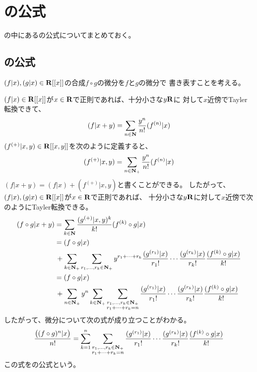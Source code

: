 {\setlength\arraycolsep{2pt}
%
\section{{\Faa}の公式}\label{s1:Faa di Brunoの公式} %
	\cite{brouder:2004}の中にある{\Faa}の公式についてまとめておく。
\subsection{{\Faa}の公式}\label{s2:Faa di Brunoの公式} %
	$(f|x),(g|x)\in\mathbf{R}[[x]]$の合成$f\circ g$の微分を$f$と$g$の微分で
	書き表すことを考える。

	$(f|x)\in\mathbf{R}[[x]]$が$x\in\mathbf{R}$で正則であれば、十分小さな$y\mathbf{R}$に
	対して$x$近傍でTayler転換できて、
	\begin{equation*}\begin{split}
		(f|x+y) = \sum_{n\in\mathbf{N}} \frac{y^n}{n!}(f^{(n)}|x)
	\end{split}\end{equation*}
	$(f^{(+)}|x,y)\in\mathbf{R}[[x,y]]$を次のように定義すると、
	\begin{equation*}\begin{split}
		(f^{(+)}|x,y) = \sum_{n\in\mathbf{N}_+} \frac{y^n}{n!}(f^{(n)}|x)
	\end{split}\end{equation*}
	$(f|x+y)=(f|x)+(f^{(+)}|x,y)$と書くことができる。
	したがって、$(f|x),(g|x)\in\mathbf{R}[[x]]$が$x\in\mathbf{R}$で正則であれば、
	十分小さな$y\mathbf{R}$に対して$x$近傍で次のようにTayler転換できる。
	\begin{equation*}\begin{split}
		(f\circ g|x+y) &= \sum_{k\in\mathbf{N}}\frac{(g^{(+)}|x,y)^k}{k!}
			(f^{(k)}\circ g|x) \\
		&= (f\circ g|x) \\
		&\,+ \sum_{k\in\mathbf{N}_+}\sum_{r_1,\dots,r_k\in\mathbf{N}_+}
			y^{r_1 +\cdots+ r_k}
			\frac{(g^{(r_1)}|x)}{r_1!}\cdots\frac{(g^{(r_k)}|x)}{r_k!}
			\frac{(f^{(k)}\circ g|x)}{k!} \\
		&= (f\circ g|x) \\
		&\,+ \sum_{n\in\mathbf{N}_+} y^n
			\sum_{k\in\mathbf{N}_+} 
			\sum_{\substack{r_1,\dots,r_k\in\mathbf{N}_+\\r_1+\cdots+r_k=n}}
			\frac{(g^{(r_1)}|x)}{r_1!}\cdots\frac{(g^{(r_k)}|x)}{r_k!}
			\frac{(f^{(k)}\circ g|x)}{k!} \\
	\end{split}\end{equation*}
	したがって、微分について次の式が成り立つことがわかる。
	\begin{equation*}\begin{split}
		\frac{\mathinner{\bigl({(f\circ g)^{n}|x}\bigr)}}{n!} = \sum_{k=1}^n 
			\sum_{\substack{r_1,\dots,r_k\in\mathbf{N}_+\\r_1+\cdots+r_k=n}}
			\frac{(g^{(r_1)}|x)}{r_1!}\cdots\frac{(g^{(r_k)}|x)}{r_k!}
			\frac{(f^{(k)}\circ g|x)}{k!} \\
	\end{split}\end{equation*}
	この式を{\Faa}の公式という。

}
